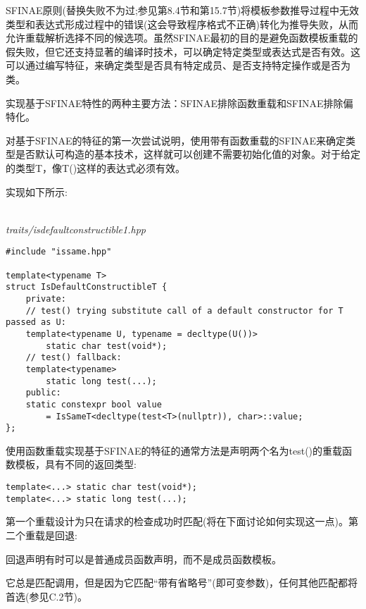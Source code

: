 
SFINAE原则(替换失败不为过;参见第8.4节和第15.7节)将模板参数推导过程中无效类型和表达式形成过程中的错误(这会导致程序格式不正确)转化为推导失败，从而允许重载解析选择不同的候选项。虽然SFINAE最初的目的是避免函数模板重载的假失败，但它还支持显著的编译时技术，可以确定特定类型或表达式是否有效。这可以通过编写特征，来确定类型是否具有特定成员、是否支持特定操作或是否为类。

实现基于SFINAE特性的两种主要方法：SFINAE排除函数重载和SFINAE排除偏特化。


对基于SFINAE的特征的第一次尝试说明，使用带有函数重载的SFINAE来确定类型是否默认可构造的基本技术，这样就可以创建不需要初始化值的对象。对于给定的类型T，像T()这样的表达式必须有效。

实现如下所示:

\hspace*{\fill} \\ %
\noindent
\textit{traits/isdefaultconstructible1.hpp}
\begin{lstlisting}[style=styleCXX]
#include "issame.hpp"

template<typename T>
struct IsDefaultConstructibleT {
	private:
	// test() trying substitute call of a default constructor for T passed as U:
	template<typename U, typename = decltype(U())>
		static char test(void*);
	// test() fallback:
	template<typename>
		static long test(...);
	public:
	static constexpr bool value
		= IsSameT<decltype(test<T>(nullptr)), char>::value;
};
\end{lstlisting}

使用函数重载实现基于SFINAE的特征的通常方法是声明两个名为test()的重载函数模板，具有不同的返回类型:

\begin{lstlisting}[style=styleCXX]
template<...> static char test(void*);
template<...> static long test(...);
\end{lstlisting}

第一个重载设计为只在请求的检查成功时匹配(将在下面讨论如何实现这一点)。第二个重载是回退:

\begin{tcolorbox}[colback=webgreen!5!white,colframe=webgreen!75!black]
\hspace*{0.75cm}回退声明有时可以是普通成员函数声明，而不是成员函数模板。
\end{tcolorbox}

它总是匹配调用，但是因为它匹配“带有省略号”(即可变参数)，任何其他匹配都将首选(参见C.2节)。

